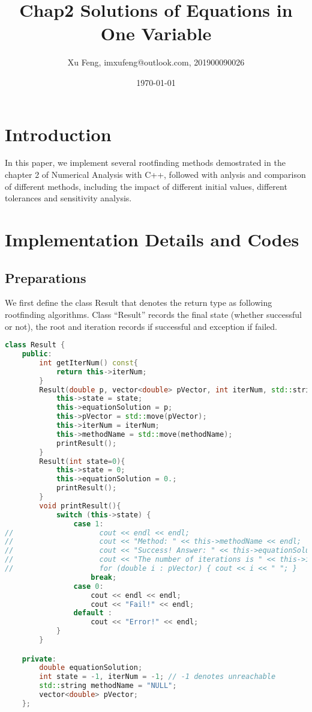 \documentclass{article}
\title{Chap2 Solutions of Equations in One Variable}
\author{Xu Feng, imxufeng@outlook.com, 201900090026}
\date{\today}
\begin{document}
\maketitle

\section{Introduction}

    In this paper, we implement several rootfinding methods demostrated in the chapter 2 of Numerical Analysis \cite{1} with C++, followed with anlysis and comparison of different methods, including the impact of different initial values, different tolerances and sensitivity analysis.

\section{Implementation Details and Codes}

\subsection{Preparations}

    We first define the class Result that denotes the return type as following rootfinding algorithms. Class ``Result'' records the final state (whether successful or not), the root and iteration records if successful and exception if failed.  

\begin{lstlisting}[language = c++]
class Result {
    public:
        int getIterNum() const{
            return this->iterNum;
        }
        Result(double p, vector<double> pVector, int iterNum, std::string methodName, int state=1){
            this->state = state;
            this->equationSolution = p;
            this->pVector = std::move(pVector);
            this->iterNum = iterNum;
            this->methodName = std::move(methodName);
            printResult();
        }
        Result(int state=0){
            this->state = 0;
            this->equationSolution = 0.;
            printResult();
        }
        void printResult(){
            switch (this->state) {
                case 1:
//                    cout << endl << endl;
//                    cout << "Method: " << this->methodName << endl;
//                    cout << "Success! Answer: " << this->equationSolution << "." <<  endl;
//                    cout << "The number of iterations is " << this->iterNum << "." << endl;
//                    for (double i : pVector) { cout << i << " "; }
                    break;
                case 0:
                    cout << endl << endl;
                    cout << "Fail!" << endl;
                default :
                    cout << "Error!" << endl;
            }
        }

    private:
        double equationSolution;
        int state = -1, iterNum = -1; // -1 denotes unreachable
        std::string methodName = "NULL";
        vector<double> pVector;
    };
\end{lstlisting}
\end{document}
